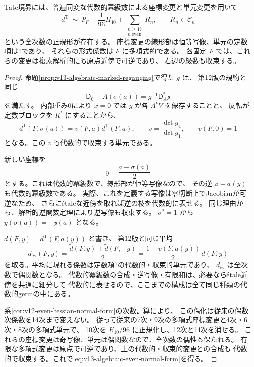 \begin{theorem}[代数的かつ収束する全次数の偶正規形]
\label{thm:v13-algebraic-even-normal-form}
Tate境界には、普遍同変な代数的冪級数による座標変更と単元変更を用いて
\begin{equation}\label{eq:v13-algebraic-even-normal-form}
 \boxed{\displaystyle
 d^{\mathrm T}\ \sim\
 P_F+\frac1{96}H_{10}
       +\sum_{\substack{n\ge16\\n\ \mathrm{even}}}R_n,
 \qquad R_n\in\mathcal C_n
 }
\end{equation}
という全次数の正規形が存在する。
座標変更の線形部は恒等写像、単元の定数項は1であり、
それらの形式係数は $F$ に多項式的である。
各固定 $F$ では、これらの変更は複素解析的にも原点近傍で可逆であり、
右辺の級数も収束する。
\end{theorem}
\begin{proof}
命題\ref{prop:v13-algebraic-marked-regauging}で得た $g$ は、
第12版の規約と同じ
\[
 \mathsf D_0+A(\sigma(a))=g^{-1}\mathsf D_A^*g
\]
を満たす。
内部重み0により $x=0$ では $g$ が各 $\Lambda^kV$ を保存することと、
反転が定数ブロックを $K^t$ にすることから、
\[
 d^{\mathrm T}(F,\sigma(a))
 =v(F,a)d^{\mathrm T}(F,a),\qquad
 v=\frac{\det g_4}{\det g_1},\qquad v(F,0)=1
\]
となる。この $v$ も代数的で収束する単元である。

新しい座標を
\[
 y=\frac{a-\sigma(a)}2
\]
とする。これは代数的冪級数で、線形部が恒等写像なので、
その逆 $a=a(y)$ も代数的冪級数である。
実際、これを定義する写像は零切断上でJacobianが可逆なため、
さらに\'etaleな近傍を取れば逆の枝を代数的に表せる。
同じ理由から、解析的逆関数定理により逆写像も収束する。
$\sigma^2=1$ から $y(\sigma(a))=-y(a)$ となる。

$\widetilde d(F,y)=d^{\mathrm T}(F,a(y))$ と書き、
第12版と同じ平均
\[
 d_{\mathrm{ev}}(F,y)
 =\frac{\widetilde d(F,y)+\widetilde d(F,-y)}2
 =\frac{1+v(F,a(y))}{2}\,\widetilde d(F,y)
\]
を取る。平均に現れる係数は定数項1の代数的・収束的単元であり、
$d_{\mathrm{ev}}$ は全次数で偶関数となる。
代数的冪級数の合成・逆写像・有限和は、必要なら\'etale近傍を共通に細分して
代数的に表せるので、ここまでの構成は全て同じ種類の代数的germの中にある。

系\ref{cor:v12-even-hessian-normal-form}の次数計算により、
この偶化は従来の偶数次係数を14次まで変えない。
従って従来の7次・9次の多項式座標変更と4次・6次・8次の多項式単元で、
10次を $H_{10}/96$ に正規化し、12次と14次を消せる。
これらの座標変更は奇写像、単元は偶関数なので、全次数の偶性も保たれる。
有限な多項式変更は原点で可逆であり、上の代数的・収束的変更との合成も
代数的で収束する。これで\eqref{eq:v13-algebraic-even-normal-form}を得る。
\end{proof}

